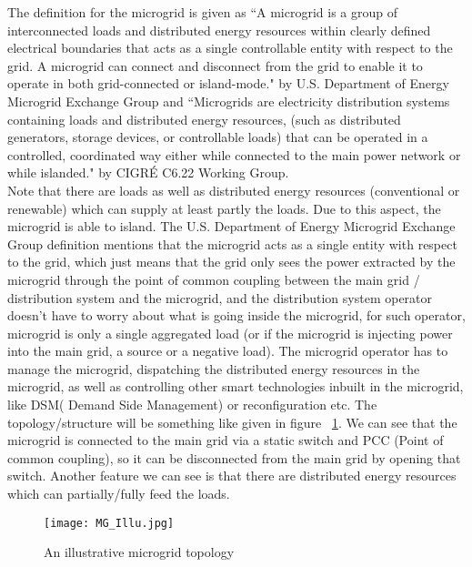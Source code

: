 The definition for the microgrid is given as ``A microgrid is a group of interconnected loads and distributed energy resources within clearly defined electrical boundaries that acts as a single controllable entity with respect to the grid. A microgrid can connect and disconnect from the grid to enable it to operate in both grid-connected or island-mode." by U.S. Department of Energy Microgrid Exchange Group\citep{TON201284} and ``Microgrids are electricity distribution systems containing loads and distributed energy resources, (such as distributed generators, storage devices, or controllable loads) that can be operated in a controlled, coordinated way either while connected to the main power network or while islanded." by CIGR\'{E} C6.22 Working Group\citep{CIGRE}.\\
Note that there are loads as well as distributed energy resources (conventional or renewable) which can supply at least partly the loads. Due to this aspect, the microgrid is able to island. The U.S. Department of Energy Microgrid Exchange Group definition mentions that the microgrid acts as a single entity with respect to the grid, which just means that the grid only sees the power extracted by the microgrid through the point of common coupling between the main grid / distribution system and the microgrid, and the distribution system operator doesn't have to worry about what is going inside the microgrid, for such operator, microgrid is only a single aggregated load (or if the microgrid is injecting power into the main grid, a source or a negative load). The microgrid operator has to manage the microgrid, dispatching the distributed energy resources in the microgrid, as well as controlling other smart technologies inbuilt in the microgrid, like DSM( Demand Side Management) or reconfiguration etc. The topology/structure will be something like given in figure ~\ref{fig:certs1}. We can see that the microgrid is connected to the main grid via a static switch and PCC (Point of common coupling), so it can be disconnected from the main grid by opening that switch. Another feature we can see is that there are distributed energy resources which can partially/fully feed the loads.
\begin{figure}[tbp]
  \centering
    \texttt{[image: MG\_Illu.jpg]}%
    \caption[Microgrid Topology]{An illustrative microgrid topology}
    \label{fig:certs1} 
\end{figure}

